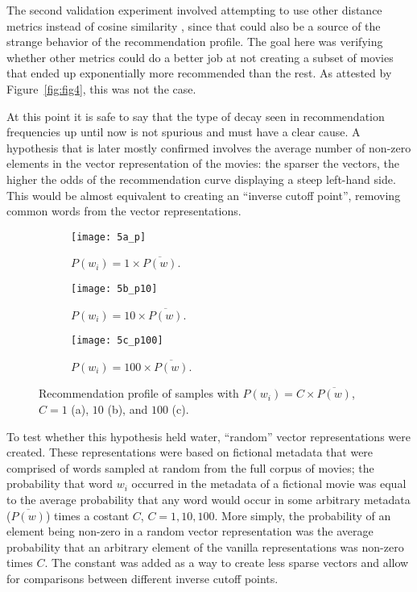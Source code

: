 The second validation experiment involved attempting to use other distance
metrics instead of cosine similarity \citep{ricci_introduction_2011}, since that
could also be a source of the strange behavior of the recommendation profile.
The goal here was verifying whether other metrics could do a better job at not
creating a subset of movies that ended up exponentially more recommended than
the rest. As attested by Figure~\ref{fig:fig4}, this was not the case.

At this point it is safe to say that the type of decay seen in recommendation
frequencies up until now is not spurious and must have a clear cause. A
hypothesis that is later mostly confirmed involves the average number of
non-zero elements in the vector representation of the movies: the sparser the
vectors, the higher the odds of the recommendation curve displaying a steep
left-hand side. This would be almost equivalent to creating an ``inverse cutoff
point'', removing common words from the vector representations.

\begin{figure}
  \centering
  \begin{subfigure}{0.3\textwidth}
    \centering
    \texttt{[image: 5a\_p]}
    \caption{$P(w_{i}) = 1 \times \overline{P(w)}$.\label{fig:fig5a}}
  \end{subfigure}
  \begin{subfigure}{0.3\textwidth}
    \centering
    \texttt{[image: 5b\_p10]}
    \caption{$P(w_{i}) = 10 \times \overline{P(w)}$.\label{fig:fig5b}}
  \end{subfigure}
  \begin{subfigure}{0.3\textwidth}
    \centering
    \texttt{[image: 5c\_p100]}
    \caption{$P(w_{i}) = 100 \times \overline{P(w)}$.\label{fig:fig5c}}
  \end{subfigure}
  \caption{Recommendation profile of samples with
    $P(w_{i}) = C \times \overline{P(w)}$, $C = 1$ (a), $10$ (b), and $100$
    (c).\label{fig:fig5}}
\end{figure}

To test whether this hypothesis held water, ``random'' vector representations
were created. These representations were based on fictional metadata that were
comprised of words sampled at random from the full corpus of movies; the
probability that word $w_{i}$ occurred in the metadata of a fictional movie was
equal to the average probability that any word would occur in some arbitrary
metadata ($\overline{P(w)}$) times a costant $C$, $C = {1, 10, 100}$. More
simply, the probability of an element being non-zero in a random vector
representation was the average probability that an arbitrary element of the
vanilla representations was non-zero times $C$. The constant was added as a way
to create less sparse vectors and allow for comparisons between different
inverse cutoff points.

